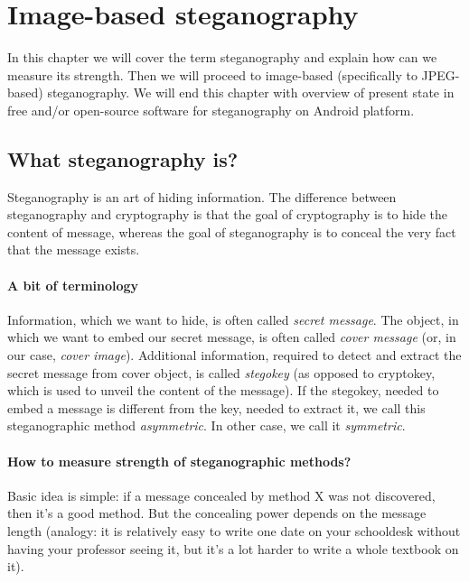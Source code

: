\chapter{Image-based steganography}
\label{ch:stego}

In this chapter we will cover the term steganography and explain 
how can we measure its strength. Then we will proceed to image-based
(specifically to JPEG-based) steganography. We will end this chapter
with overview of present state in free and/or open-source software
for steganography on Android platform.

\section{What steganography is?}

Steganography is an art of hiding information. The difference between steganography and
cryptography is that the goal of cryptography is to hide the content of message, whereas
the goal of steganography is to conceal the very fact that the message exists.

\subsubsection{A bit of terminology}

Information, which we want to hide, is often called \textit{secret message}. The object,
in which we want to embed our secret message, is often called \textit{cover message} (or, in our case,
\textit{cover image}). Additional information, required to detect and extract the secret message
from cover object, is called \textit{stegokey} (as opposed to cryptokey, which is used to 
unveil the content of the message). If the stegokey, needed to embed a message is different
from the key, needed to extract it, we call this steganographic method \textit{asymmetric}. In
other case, we call it \textit{symmetric}.

\subsubsection{How to measure strength of steganographic methods?}

Basic idea is simple: if a message concealed by method X was not discovered, then it's a good method.
But the concealing power depends on the message length (analogy: it is relatively easy
to write one date on your schooldesk without having your professor seeing it, but it's a lot
harder to write a whole textbook on it). 

